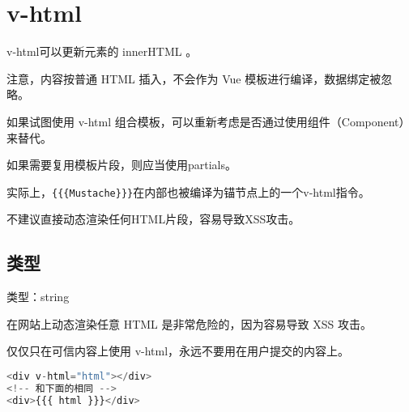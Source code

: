 \begin{lstlisting}[language=JavaScript]

\end{lstlisting}

\section{v-html}

v-html可以更新元素的 innerHTML 。

注意，内容按普通 HTML 插入，不会作为 Vue 模板进行编译，数据绑定被忽略。

\begin{compactitem}
\item 如果试图使用 v-html 组合模板，可以重新考虑是否通过使用组件（Component）来替代。
\item 如果需要复用模板片段，则应当使用partials。
\end{compactitem}

实际上，\texttt{\{\{\{Mustache\}\}\}}在内部也被编译为锚节点上的一个v-html指令。

不建议直接动态渲染任何HTML片段，容易导致XSS攻击。

\subsection{类型}

\begin{compactitem}
\item 类型：string
\end{compactitem}

在网站上动态渲染任意 HTML 是非常危险的，因为容易导致 XSS 攻击。

仅仅只在可信内容上使用 v-html，永远不要用在用户提交的内容上。


\begin{lstlisting}[language=JavaScript]
<div v-html="html"></div>
<!-- 和下面的相同 -->
<div>{{{ html }}}</div>
\end{lstlisting}



\begin{lstlisting}[language=JavaScript]

\end{lstlisting}




\begin{lstlisting}[language=JavaScript]

\end{lstlisting}




